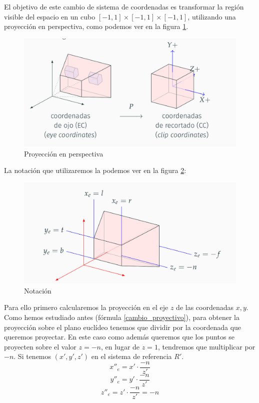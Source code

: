 \documentclass[a4paper,11pt, oneside]{book}
\begin{document}
El objetivo de este cambio de sistema de coordenadas es transformar la región visible del espacio en un cubo $[-1,1]\times [-1,1]\times [-1,1]$, utilizando una proyección en perspectiva, como podemos ver en la figura \ref{fig:perspectiva}.
\begin{figure}[H]
	
	\centering
	\includegraphics[width=0.9\linewidth]{cubo}
	\caption{Proyección en perspectiva \cite{informatica-grafica}}
	\label{fig:perspectiva}
	
\end{figure}

La notación que utilizaremos la podemos ver en la figura \ref{fig:notacion}:
\begin{figure}[H]
	
	\centering
	\includegraphics[width=0.9\linewidth]{notacion}
	\caption{Notación \cite{informatica-grafica}}
	\label{fig:notacion}
	
\end{figure}

Para ello primero calcularemos la proyección en el eje $z$ de las coordenadas $x,y$. Como hemos estudiado antes (fórmula \ref{cambio_proyectivo}), para obtener la proyección sobre el plano euclídeo tenemos que dividir por la coordenada que queremos proyectar. En este caso como además queremos que los puntos se proyecten sobre el valor $z=-n$, en lugar de $z=1$, tendremos que multiplicar por $-n$. Si tenemos $(x',y',z')$ en el sistema de referencia $R'$.
\begin{equation}
x''_e = x'\cdot\frac{-n}{z'}
\end{equation}
\begin{equation}
y''_e = y'\cdot\frac{-n}{z'}
\end{equation}
\begin{equation}
z''_e = z'\cdot\frac{-n}{z'} = -n
\end{equation}
\end{document}

